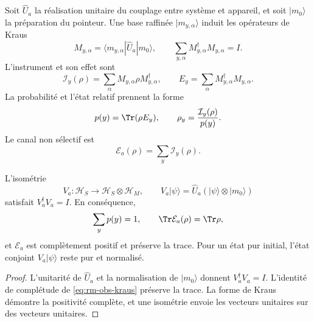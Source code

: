 Soit \(\widehat U_a\) la réalisation unitaire du couplage entre
système et appareil, et soit \(|m_0\rangle\) la préparation du pointeur. Une
base raffinée \(|m_{y,\alpha}\rangle\) induit les opérateurs de Kraus
\begin{equation}
 M_{y,\alpha}
 =\langle m_{y,\alpha}|\widehat U_a|m_0\rangle,
 \qquad
 \sum_{y,\alpha}M_{y,\alpha}^{\dagger}M_{y,\alpha}=I.
 \label{eq:rm-obs-kraus}
\end{equation}
L'instrument et son effet sont
\begin{equation}
 \mathcal I_y(\rho)
 =\sum_\alpha M_{y,\alpha}\rho M_{y,\alpha}^{\dagger},
 \qquad
 E_y=\sum_\alpha M_{y,\alpha}^{\dagger}M_{y,\alpha}.
 \label{eq:rm-obs-instrument}
\end{equation}
La probabilité et l'état relatif prennent la forme
\begin{equation}
 p(y)=\Tr(\rho E_y),
 \qquad
 \rho_y=\frac{\mathcal I_y(\rho)}{p(y)}.
 \label{eq:rm-obs-general-conditioned-state}
\end{equation}
Le canal non sélectif est
\begin{equation}
 \mathcal E_a(\rho)=\sum_y\mathcal I_y(\rho).
 \label{eq:rm-obs-unconditioned-channel}
\end{equation}

\begin{proposition}
\label{prop:rm-obs-global-channel}
L'isométrie
\begin{equation}
 V_a:\mathcal H_S\longrightarrow\mathcal H_S\otimes\mathcal H_M,
 \qquad
 V_a|\psi\rangle=\widehat U_a(|\psi\rangle\otimes|m_0\rangle)
 \label{eq:rm-obs-stinespring-isometry}
\end{equation}
satisfait \(V_a^\dagger V_a=I\). En conséquence,
\begin{equation}
 \sum_y p(y)=1,
 \qquad
 \Tr\mathcal E_a(\rho)=\Tr\rho,
 \label{eq:rm-obs-trace-preservation}
\end{equation}
et \(\mathcal E_a\) est complètement positif et préserve la trace.
Pour un état pur initial, l'état conjoint
\(V_a|\psi\rangle\) reste pur et normalisé.
\end{proposition}

\begin{proof}
L'unitarité de \(\widehat U_a\) et la normalisation de
\(|m_0\rangle\) donnent \(V_a^\dagger V_a=I\). L'identité de complétude de
\cref{eq:rm-obs-kraus} préserve la trace. La forme de Kraus démontre
la positivité complète, et une isométrie envoie les vecteurs unitaires sur des
vecteurs unitaires.
\end{proof}

